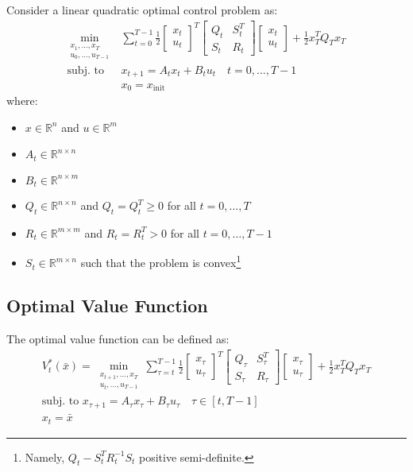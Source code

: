 \documentclass[openany]{book}
\theoremstyle{definition}
\theoremstyle{remark}
\begin{document}
Consider a linear quadratic optimal control problem as:
\begin{align*}
\min_{\substack{x_1,\dots,x_T \\ u_0,\dots,u_{T-1}}} & \sum_{t=0}^{T-1} \frac{1}{2}\begin{bmatrix}
x_t \\ u_t
\end{bmatrix}^T \begin{bmatrix}
Q_t & S_t^T \\ S_t & R_t
\end{bmatrix} \begin{bmatrix}
x_t \\ u_t
\end{bmatrix} + \frac{1}{2}x_T^T Q_T x_T\\
\text{subj. to } & x_{t+1} = A_tx_t + B_tu_t \quad t=0,\dots,T-1\\
&x_0 = x_{\text{init}}
\end{align*}
where:
\begin{itemize}
\item $x \in \mathbb{R}^n$ and $u \in \mathbb{R}^m$
\item $A_t \in \mathbb{R}^{n\times n}$
\item $B_t \in \mathbb{R}^{n\times m}$
\item $Q_t \in \mathbb{R}^{n\times n}$ and $Q_t = Q_t^T \geq 0$ for all $t=0,\dots,T$
\item $R_t \in \mathbb{R}^{m\times m}$ and $R_t = R_t^T > 0$ for all $t=0,\dots,T-1$
\item $S_t \in \mathbb{R}^{m\times n}$ such that the problem is convex\footnote{Namely, $Q_t - S_t^T R_t^{-1} S_t$ positive semi-definite.}
\end{itemize}

\subsection{Optimal Value Function}
The optimal value function can be defined as:
\begin{align*}
V_t^*(\bar{x}) = \min_{\substack{x_{t+1},\dots,x_T\\u_t,\dots,u_{T-1}}} \sum_{\tau=t}^{T-1} \frac{1}{2}\begin{bmatrix}
x_\tau \\ u_\tau
\end{bmatrix}^T \begin{bmatrix}
Q_\tau & S_\tau^T \\ S_\tau & R_\tau
\end{bmatrix} \begin{bmatrix}
x_\tau \\ u_\tau
\end{bmatrix} + \frac{1}{2}x_T^T Q_T x_T\\
\text{subj. to } x_{\tau+1} = A_\tau x_\tau + B_\tau u_\tau \quad \tau \in [t,T-1]\\
x_t = \bar{x}
\end{align*}
\end{document}
